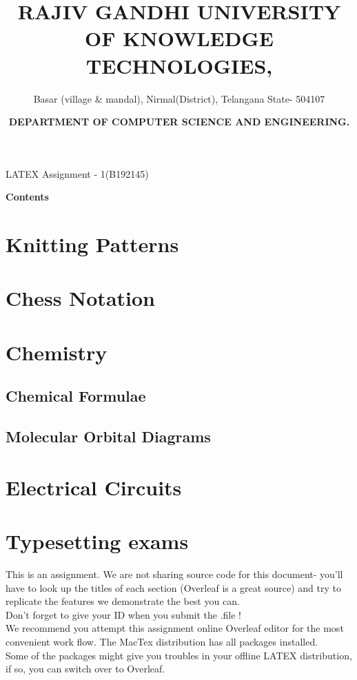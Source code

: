 \documentclass{knittingpattern}
\title{\color{blue}\centering\large\textbf{RAJIV GANDHI UNIVERSITY OF KNOWLEDGE TECHNOLOGIES,}}
\author{\color{blue}\centering\normalsize Basar (village \& mandal), Nirmal(District), Telangana State- 504107 }
\date{ \color{red}\centering \large \textbf{DEPARTMENT OF COMPUTER SCIENCE AND ENGINEERING.}}
\begin{document}
\maketitle
\hline
\vspace{0.5 cm}
\centering
\large{LATEX Assignment - 1(B192145)}
\\
\begin{flushleft}
\Large\textbf{Contents}
\section{Knitting Patterns}
\section{Chess Notation}
\section{Chemistry}
\subsection{Chemical Formulae}
\subsection{Molecular Orbital Diagrams}
\section{Electrical Circuits}
\section{Typesetting exams}
\end{flushleft}
\raggedright
This is an assignment. We are not sharing source code for this document- you'll have to look up the titles of each section (Overleaf is a great source) and try to replicate the features we demonstrate the best you can.\\
\medskip
Don't forget to give your ID when you submit the .file !\\
\medskip
We recommend you attempt this assignment online Overleaf editor for the most convenient work flow. The MacTex distribution has all packages installed.\\
\medskip
Some of the packages might give you troubles in your offline LATEX distribution, if so, you can switch over to Overleaf.\\
\bigskip
\bigskip
\centering
{}
\newpage
{}
\end{document}

